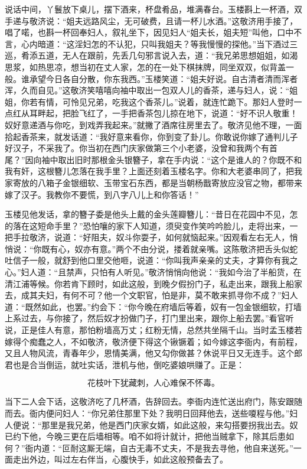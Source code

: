 说话中间，丫鬟放下桌儿，摆下酒来，杯盘肴品，堆满春台。玉楼斟上一杯酒，双手递与敬济说：“姐夫远路风尘，无可破费，且请一杯儿水酒。”这敬济用手接了，唱了喏，也斟一杯回奉妇人，叙礼坐下，因见妇人“姐夫长，姐夫短”叫他，口中不言，心内暗道：“这淫妇怎的不认犯，只叫我姐夫？等我慢慢的探他。”当下酒过三巡，肴添五道，无人在跟前，先丢几句邪言说入去，道：“我兄弟思想姐姐，如渴思浆，如热思凉，想当初在丈人家，怎的在一处下棋抹牌，同坐双双，似背盖一般。谁承望今日各自分散，你东我西。”玉楼笑道：“姐夫好说。自古清者清而浑者浑，久而自见。”这敬济笑嘻嘻向袖中取出一包双人儿的香茶，递与妇人，说：“姐姐，你若有情，可怜见兄弟，吃我这个香茶儿。”说着，就连忙跪下。那妇人登时一点红从耳畔起，把脸飞红了，一手把香茶包儿掠在地下，说道：“好不识人敬重！奴好意递酒与你吃，到戏弄我起来。”就撇了酒席往房里去了。敬济见他不理，一面拾起香茶来，就发话道：“我好意来看你，你到变了卦儿。你敢说你嫁了通判儿子好汉子，不采我了。你当初在西门庆家做第三个小老婆，没曾和我两个有首尾？”因向袖中取出旧时那根金头银簪子，拿在手内说：“这个是谁人的？你既不和我有奸，这根簪儿怎落在我手里？上面还刻着玉楼名字。你和大老婆串同了，把我家寄放的八箱子金银细软、玉带宝石东西，都是当朝杨戬寄放应没官之物，都带来嫁了汉子。我教你不要慌，到八字八儿上和你答话！”

玉楼见他发话，拿的簪子委是他头上戴的金头莲瓣簪儿：“昔日在花园中不见，怎的落在这短命手里？”恐怕嚷的家下人知道，须臾变作笑吟吟脸儿，走将出来，一把手拉敬济，说道：“好阻夫，奴斗你耍子，如何就恼起来。”因观看左右无人，悄悄说：“你既有心，奴亦有意。”两个不由分说，搂着就亲嘴。这陈敬济把舌头似蛇吐信子一般，就舒到他口里交他咂，说道：“你叫我声亲亲的丈夫，才算你有我之心。”妇人道：“且禁声，只怕有人听见。”敬济悄悄向他说：“我如今治了半船货，在清江浦等候。你若肯下顾时，如此这般，到晚夕假扮门子，私走出来，跟我上船家去，成其夫妇，有何不可？他一个文职官，怕是非，莫不敢来抓寻你不成？”妇人道：“既然如此，也罢。”约会下：“你今晚在府墙后等着，奴有一包金银细软，打墙上系过去，与你接了，然后奴才扮做门子，打门里出来，跟你上船去罢。”看官听说，正是佳人有意，那怕粉墙高万丈；红粉无情，总然共坐隔千山。当时孟玉楼若嫁得个痴蠢之人，不如敬济，敬济便下得这个锹镢着；如今嫁这李衙内，有前程，又且人物风流，青春年少，恩情美满，他又勾你做甚？休说平日又无连手。这个郎君也是合当倒运，就吐实话，泄机与他，倒吃婆娘哄赚了。正是：

\[
花枝叶下犹藏刺，人心难保不怀毒。
\]

当下二人会下话，这敬济吃了几杯酒，告辞回去。李衙内连忙送出府门，陈安跟随而去。衙内便问妇人：“你兄弟住那里下处？我明日回拜他去，送些嗄程与他。”妇人便说：“那里是我兄弟，他是西门庆家女婿，如此这般，来勾搭要拐我出去。奴已约下他，今晚三更在后墙相等。咱不如将计就计，把他当贼拿下，除其后患如何？”衙内道：“叵耐这厮无端，自古无毒不丈夫，不是我去寻他，他自来送死。”一面走出外边，叫过左右伴当，心腹快手，如此这般预备去了。

